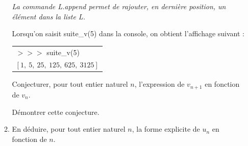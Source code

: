 \begin{enumerate}
\begin{enumerate}
\emph{La commande \og L.append \fg permet de rajouter, en dernière position, un élément dans la liste L.}

Lorsqu'on saisit {\ttfamily suite\_v(5)} dans la console, on obtient l'affichage suivant :

\begin{center}
\begin{tabular}{>{\ttfamily} l}
$>>>$ suite\_v(5)\\
$[1,\: 5,\: 25,\: 125,\: 625,\: 3125]$\\
\end{tabular}
\end{center}

Conjecturer, pour tout entier naturel $n$, l'expression de $v_{n+1}$ en fonction de $v_n$.

Démontrer cette conjecture.
		\item En déduire, pour tout entier naturel $n$, la forme explicite de $u_n$ en fonction de $n$.
	\end{enumerate}
\end{enumerate}

\bigskip
